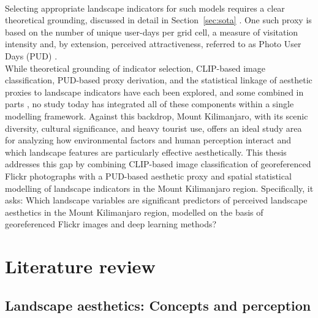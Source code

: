 \documentclass[hidelinks, 11pt]{article}
\begin{document}
\\
Selecting appropriate landscape indicators for such models requires a clear theoretical grounding, discussed in detail in Section~\ref{sec:sota} \citep{ode_capturing_2008,tribot_integrating_2018}. One such proxy is based on the number of unique user-days per grid cell, a measure of visitation intensity and, by extension, perceived attractiveness, referred to as Photo User Days (PUD) \citep{wood_using_2013}.
\\
While theoretical grounding of indicator selection, CLIP-based image classification, PUD-based proxy derivation, and the statistical linkage of aesthetic proxies to landscape indicators have each been explored, and some combined in parts \citep{liao_oneshot_2025,liao_mapping_2025,vaz_digital_2020}, no study today has integrated all of these components within a single modelling framework. Against this backdrop, Mount Kilimanjaro, with its scenic diversity, cultural significance, and heavy tourist use, offers an ideal study area for analyzing how environmental factors and human perception interact and which landscape features are particularly effective aesthetically. This thesis addresses this gap by combining CLIP-based image classification of georeferenced Flickr photographs with a PUD-based aesthetic proxy and spatial statistical modelling of landscape indicators in the Mount Kilimanjaro region. Specifically, it asks: Which landscape variables are significant predictors of perceived landscape aesthetics in the Mount Kilimanjaro region, modelled on the basis of georeferenced Flickr images and deep learning methods?


\section{Literature review}\label{sec:Einleitung}

\subsection{Landscape aesthetics: Concepts and perception}\label{sec:LAConcepts}
\end{document}
